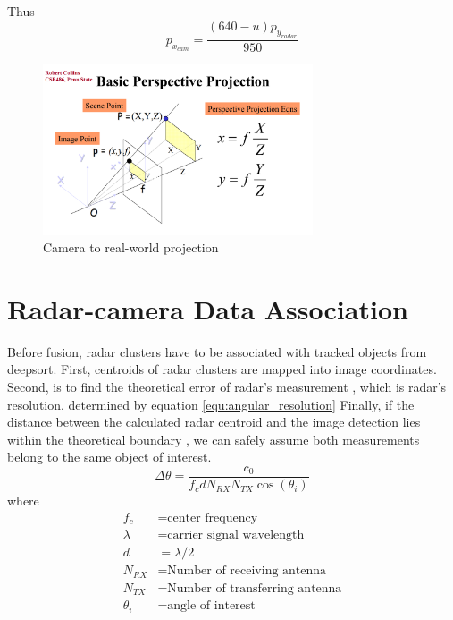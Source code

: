 Thus
\begin{equation}\label{equ:2_cam_px}
    p_{x_{cam}}=
    \frac
    {(640-u)p_{y_{radar}}}
    {950}
\end{equation}






\begin{figure}[hpbt]
    \centering
    \includegraphics[width=8cm]{Figures/cam_projection.png}%
    \caption{Camera to real-world projection}
    \label{fig:camera_projection}
\end{figure}
\newpage
\section{Radar-camera Data Association}\label{sec:2-association}
Before fusion, radar clusters have to be associated with tracked objects from deepsort.
First, centroids of radar clusters are mapped into image coordinates.
Second, is to find the theoretical error of radar's measurement \cite{8844649}, which is radar's resolution, determined by equation \ref*{equ:angular_resolution}
Finally, if the distance between the calculated radar centroid and the image detection lies within the theoretical boundary
, we can safely assume both measurements belong to the same object of interest.
\begin{equation}\label{equ:angular_resolution}
    \Delta \theta= \frac{c_0}{f_c d N_{RX} N_{TX} \cos(\theta _i)}
\end{equation}
where
\begin{align*}
    f_c & = \text{center frequency} \\
    \lambda & = \text{carrier signal wavelength} \\
    d & =  \lambda/2 \\
    N_{RX} & = \text{Number of receiving antenna}\\
    N_{TX}& = \text{Number of transferring antenna}\\
    \theta _i &= \text{angle of interest}
\end{align*}

